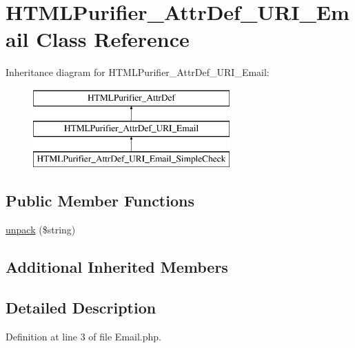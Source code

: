 \hypertarget{classHTMLPurifier__AttrDef__URI__Email}{\section{H\+T\+M\+L\+Purifier\+\_\+\+Attr\+Def\+\_\+\+U\+R\+I\+\_\+\+Email Class Reference}
\label{classHTMLPurifier__AttrDef__URI__Email}
}
Inheritance diagram for H\+T\+M\+L\+Purifier\+\_\+\+Attr\+Def\+\_\+\+U\+R\+I\+\_\+\+Email\+:\begin{figure}[H]
\begin{center}
\leavevmode
\includegraphics[height=3.000000cm]{classHTMLPurifier__AttrDef__URI__Email}
\end{center}
\end{figure}
\subsection*{Public Member Functions}
\begin{DoxyCompactItemize}
\item 
\hyperlink{classHTMLPurifier__AttrDef__URI__Email_ac26c907a900a4c75892103e191437416}{unpack} (\$string)
\end{DoxyCompactItemize}
\subsection*{Additional Inherited Members}


\subsection{Detailed Description}


Definition at line 3 of file Email.\+php.



